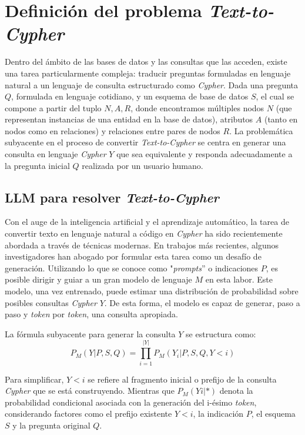 \section{Definición del problema \textit{Text-to-Cypher}} \label{problem_definition}
Dentro del ámbito de las bases de datos y las consultas que las acceden, existe una tarea particularmente compleja: traducir preguntas formuladas en lenguaje natural a un lenguaje de consulta estructurado como \textit{Cypher}. Dada una pregunta $Q$, formulada en lenguaje cotidiano, y un esquema de base de datos $S$, el cual se compone a partir del tuplo ${N, A, R}$, donde encontramos múltiples nodos $N$ (que representan instancias de una entidad en la base de datos), atributos $A$ (tanto en nodos como en relaciones) y relaciones entre pares de nodos $R$. La problemática subyacente en el proceso de convertir \textit{Text-to-Cypher} se centra en generar una consulta en lenguaje \textit{Cypher} $Y$ que sea equivalente y responda adecuadamente a la pregunta inicial $Q$ realizada por un usuario humano.

\subsection{LLM para resolver \textit{Text-to-Cypher}} \label{llmfortext2cypher}

Con el auge de la inteligencia artificial y el aprendizaje automático, la tarea de convertir texto en lenguaje natural a código en \textit{Cypher} ha sido recientemente abordada a través de técnicas modernas. En trabajos más recientes, algunos investigadores \cite{sunetal2023} \cite{liuetal2023} han abogado por formular esta tarea como un desafío de generación. Utilizando lo que se conoce como "\textit{prompts}'' o indicaciones $P$, es posible dirigir y guiar a un gran modelo de lenguaje $M$ en esta labor. Este modelo, una vez entrenado, puede estimar una distribución de probabilidad sobre posibles consultas \textit{Cypher} $Y$. De esta forma, el modelo es capaz de generar, paso a paso y \textit{token} por \textit{token}, una consulta apropiada.

La fórmula subyacente para generar la consulta $Y$ se estructura como:
$$P_M(Y|P, S, Q) = \prod_{i=1}^{|Y|}{P_M(Y_i | P, S, Q, Y < i)}$$ \label{llm_query_generation}

Para simplificar, $Y< i$ se refiere al fragmento inicial o prefijo de la consulta \textit{Cypher} que se está construyendo. Mientras que $P_M(Yi|*)$ denota la probabilidad condicional asociada con la generación del i-ésimo \textit{token}, considerando factores como el prefijo existente $Y<i$, la indicación $P$, el esquema $S$ y la pregunta original $Q$.

